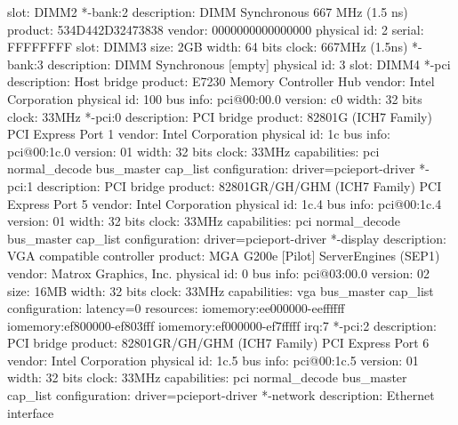 \documentclass[mingoth,a4paper]{jsarticle}
\begin{document}
{{{{{{{{{{{{{{\begin{commandline}
             slot: DIMM2
        *-bank:2
             description: DIMM Synchronous 667 MHz (1.5 ns)
             product: 534D442D32473838
             vendor: 0000000000000000
             physical id: 2
             serial: FFFFFFFF
             slot: DIMM3
             size: 2GB
             width: 64 bits
             clock: 667MHz (1.5ns)
        *-bank:3
             description: DIMM Synchronous [empty]
             physical id: 3
             slot: DIMM4
     *-pci
          description: Host bridge
          product: E7230 Memory Controller Hub
          vendor: Intel Corporation
          physical id: 100
          bus info: pci@00:00.0
          version: c0
          width: 32 bits
          clock: 33MHz
        *-pci:0
             description: PCI bridge
             product: 82801G (ICH7 Family) PCI Express Port 1
             vendor: Intel Corporation
             physical id: 1c
             bus info: pci@00:1c.0
             version: 01
             width: 32 bits
             clock: 33MHz
             capabilities: pci normal_decode bus_master cap_list
             configuration: driver=pcieport-driver
        *-pci:1
             description: PCI bridge
             product: 82801GR/GH/GHM (ICH7 Family) PCI Express Port 5
             vendor: Intel Corporation
             physical id: 1c.4
             bus info: pci@00:1c.4
             version: 01
             width: 32 bits
             clock: 33MHz
             capabilities: pci normal_decode bus_master cap_list
             configuration: driver=pcieport-driver
           *-display
                description: VGA compatible controller
                product: MGA G200e [Pilot] ServerEngines (SEP1)
                vendor: Matrox Graphics, Inc.
                physical id: 0
                bus info: pci@03:00.0
                version: 02
                size: 16MB
                width: 32 bits
                clock: 33MHz
                capabilities: vga bus_master cap_list
                configuration: latency=0
                resources: iomemory:ee000000-eeffffff iomemory:ef800000-ef803fff iomemory:ef000000-ef7fffff irq:7
        *-pci:2
             description: PCI bridge
             product: 82801GR/GH/GHM (ICH7 Family) PCI Express Port 6
             vendor: Intel Corporation
             physical id: 1c.5
             bus info: pci@00:1c.5
             version: 01
             width: 32 bits
             clock: 33MHz
             capabilities: pci normal_decode bus_master cap_list
             configuration: driver=pcieport-driver
           *-network
                description: Ethernet interface

\end{commandline}}}}}}}}}}}}}}}
\end{document}

